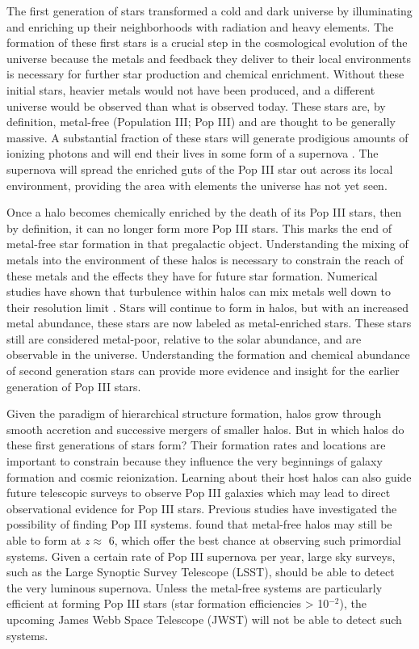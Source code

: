 \documentclass[a4paper,fleqn,usenatbib]{mnras}
\begin{document}
The first generation of stars transformed a cold and dark universe
by illuminating and enriching up their neighborhoods with radiation
and heavy elements. The formation of these first stars is a crucial step in the cosmological evolution of the universe because the metals and feedback they deliver to their local environments is necessary for further star production and chemical enrichment. Without these initial stars, heavier metals would not have been produced, and a different universe would be observed than what is observed today. These stars are, by definition, metal-free (Population III; Pop III) and are thought to be generally massive. A substantial fraction of these stars will generate prodigious amounts of ionizing photons and will end their lives in some form of a supernova \citep[e.g.][]{Schaerer02, Heger02}. The supernova will spread the enriched guts of the Pop III star out across its local environment, providing the area with elements the universe has not yet seen. 

Once a halo becomes chemically enriched by the death of its Pop III stars, then by definition, it can no longer form more Pop III stars. This marks the end of metal-free star formation in that pregalactic object. Understanding the mixing of metals into the environment of these halos is necessary to constrain the reach of these metals and the effects they have for future star formation. Numerical studies have shown that turbulence within halos can mix metals well down to their resolution limit \citep[][and more]{Wise08_Gal, Greif10}. Stars will continue to form in halos, but with an increased metal abundance, these stars are now labeled as metal-enriched stars. These stars still are considered metal-poor, relative to the solar abundance, and are observable in the universe. Understanding the formation and chemical abundance of second generation stars can provide more evidence and insight for the earlier generation of Pop III stars.

Given the paradigm of hierarchical structure formation, halos grow through smooth accretion and successive mergers of smaller halos. But in which halos do these first generations of stars form? Their formation rates and locations are important to constrain because they influence the very beginnings of galaxy formation and cosmic reionization. Learning about their host halos can also guide future telescopic surveys to observe Pop III galaxies which may lead to direct observational evidence for Pop III stars. Previous studies have investigated the possibility of finding Pop III systems. \citet{Trenti09} found that metal-free halos may still be able to form at $z \approx$ 6, which offer the best chance at observing such primordial systems. Given a certain rate of Pop III supernova per year, large sky surveys, such as the Large Synoptic Survey Telescope (LSST), should be able to detect the very luminous supernova. Unless the metal-free systems are particularly efficient at forming Pop III stars (star formation efficiencies > 10$^{-2}$), the upcoming James Webb Space Telescope (JWST) will not be able to detect such systems.
\end{document}
